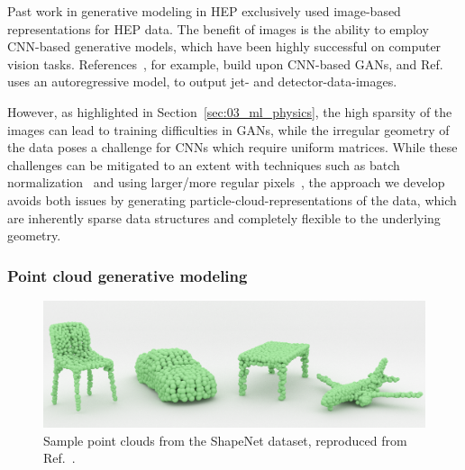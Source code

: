 Past work in generative modeling in HEP exclusively used image-based representations for HEP data.
The benefit of images is the ability to employ CNN-based generative models, which have been highly successful on computer vision tasks. 
References~\cite{deOliveira:2017pjk, Paganini:2017dwg, ATL-SOFT-PUB-2018-001, ATL-SOFT-PUB-2020-006, Erdmann:2018jxd, Carminati:2020kym}, 
for example, build upon CNN-based GANs, and Ref.~\cite{sarm} uses an autoregressive model, to output jet- and detector-data-images. 

However, as highlighted in Section~\ref{sec:03_ml_physics}, the high sparsity of the images can lead to training difficulties in GANs, while the irregular geometry of the data poses a challenge for CNNs which require uniform matrices.
While these challenges can be mitigated to an extent with techniques such as batch normalization~\cite{ioffe2015batch} and using larger/more regular pixels~\cite{ATL-SOFT-PUB-2020-006}, the approach we develop avoids both issues by generating particle-cloud-representations of the data, which are inherently sparse data structures and completely flexible to the underlying geometry.


\subsubsection{Point cloud generative modeling}
\label{sec:04_mpgan_pcgans}


\begin{figure}[ht]
    \centering
    \includegraphics[width=\textwidth]{figures/03-ML/shapenet}
    \caption{Sample point clouds from the ShapeNet dataset, reproduced from Ref.~\cite{DBLP:journals/corr/GadelhaMW17}.}
    \label{fig:03_ml_shapenet}
\end{figure}

